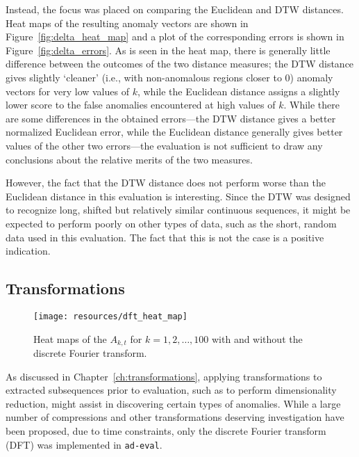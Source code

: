 Instead, the focus was placed on comparing the Euclidean and DTW distances. Heat maps of the resulting anomaly vectors are shown in Figure~\ref{fig:delta_heat_map} and a plot of the corresponding errors is shown in Figure~\ref{fig:delta_errors}. As is seen in the heat map, there is generally little difference between the outcomes of the two distance measures; the DTW distance gives slightly `cleaner' (i.e.\@, with non-anomalous regions closer to $0$) anomaly vectors for very low values of $k$, while the Euclidean distance assigns a slightly lower score to the false anomalies encountered at high values of $k$. While there are some differences in the obtained errors---the DTW distance gives a better normalized Euclidean error, while the Euclidean distance generally gives better values of the other two errors---the evaluation is not sufficient to draw any conclusions about the relative merits of the two measures.

However, the fact that the DTW distance does not perform worse than the Euclidean distance in this evaluation is interesting. Since the DTW was designed to recognize long, shifted but relatively similar continuous sequences, it might be expected to perform poorly on other types of data, such as the short, random data used in this evaluation. The fact that this is not the case is a positive indication.

\clearpage

\subsection{Transformations}
\FloatBarrier{}

\begin{figure}[h]
    \vspace{-10pt}
    \begin{center}
        \texttt{[image: resources/dft\_heat\_map]}
    \end{center}
    \vspace{-20pt}
    \caption{\small{Heat maps of the $A_{k, t} $ for $k = 1,2,\dots,100$ with and without the discrete Fourier transform.}}
    \vspace{-10pt}
\label{fig:dft_heat_map}
\end{figure}

As discussed in Chapter~\ref{ch:transformations}, applying transformations to extracted subsequences prior to evaluation, such as to perform dimensionality reduction, might assist in discovering certain types of anomalies. While a large number of compressions and other transformations deserving investigation have been proposed, due to time constraints, only the discrete Fourier transform (DFT) was implemented in \texttt{ad-eval}.

